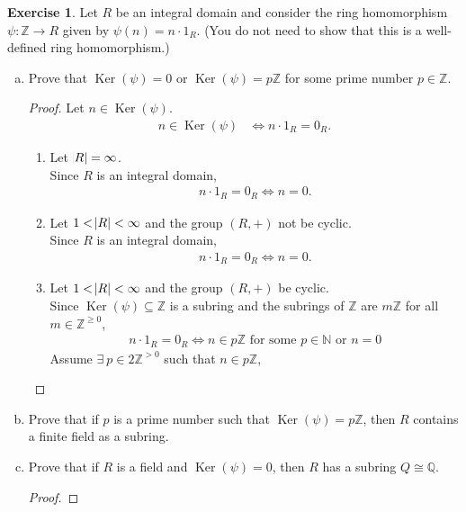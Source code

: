 \documentclass{article}
\newcommand{\bbz}{\mathbb{Z}}
\newcommand{\bbq}{\mathbb{Q}}
\newcommand{\bbn}{\mathbb{N}}
\renewcommand{\ker}{\operatorname{Ker}}
\theoremstyle{plain}
\theoremstyle{definition}
\newtheorem{exer}[lem]{Exercise}
\begin{document}
\begin{exer}
Let $R$ be an integral domain and consider the ring homomorphism $\psi\colon\bbz\to R$ given by $\psi(n)=n\cdot 1_R$.
(You do not need to show that this is a well-defined ring homomorphism.)
\begin{enumerate}[(a)]
\item Prove that $\ker(\psi)=0$ or $\ker(\psi)=p\bbz$ for some prime number $p\in\bbz$.
    \begin{proof}
        Let $n \in \ker(\psi)$.
        \begin{align*}
            n \in \ker(\psi) &\Longleftrightarrow n\cdot 1_R =0_R.
        \end{align*}
            \begin{enumerate}[(1)]
                \item
                    Let $\abs{R} = \infty$.\\
                    Since $R$ is an integral domain,
                    \begin{align*}
                        n\cdot 1_R =0_R \Longleftrightarrow n = 0.
                    \end{align*}
                \item Let $1<\abs{R} < \infty$ and the group $(R,+)$ not be cyclic.\\
                    Since $R$ is an integral domain,
                    \begin{align*}
                        n\cdot 1_R =0_R \Longleftrightarrow n = 0.
                    \end{align*}
                \item Let $1<\abs{R}  < \infty$ and the group $(R,+)$ be cyclic. \\
                    Since $\ker(\psi) \subseteq \bbz$ is a subring and the subrings of $\bbz$ are $m\bbz$ for all $m \in \bbz^{\geq 0}$,
                    \begin{align*}
                        n\cdot 1_R =0_R \Longleftrightarrow n \in p\bbz \text{ for some } p \in \bbn \text{ or } n = 0
                    \end{align*}
                    Assume $\exists \ p \in 2\bbz^{> 0}$ such that $n \in p \bbz$,
            \end{enumerate}
    \end{proof}
\item 
    Prove that if $p$ is a prime number such that $\ker(\psi)=p\bbz$, then $R$ contains a finite field as a subring.

\item Prove that if $R$ is a field and $\ker(\psi)=0$, then $R$ has a subring $Q\cong\bbq$.
    \begin{proof}
    \end{proof}
\end{enumerate}
\end{exer}

\newpage 
\end{document}

